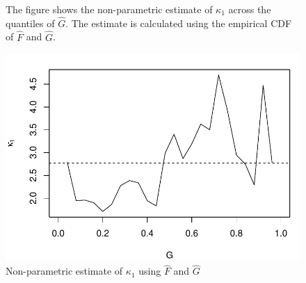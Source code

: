 \documentclass[11pt,letterpaper]{article}
\newcommand{\floatintro}[1]{
  
  \vspace*{0.1in}
  
  {\footnotesize

    #1
    
  }
  
  \vspace*{0.1in} }
\begin{document}
\begin{enumerate}
  \begin{figure}[htbp!]
    \floatintro{The figure shows the non-parametric estimate of
      $\kappa_1$ across the quantiles of $\hat G$. The estimate is
      calculated using the empirical CDF of $\hat F$ and $\hat G$. }
    \centering
    \includegraphics[scale=.6]{./pics/kappa1_np.pdf}
    \caption{Non-parametric estimate of $\kappa_1$ using $\hat F$ and
      $\hat G$}
    \label{fig:kappa}
  \end{figure}
 
\end{enumerate}
\end{document}
